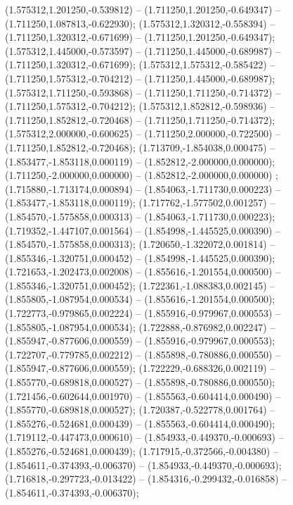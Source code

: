  (1.575312,1.201250,-0.539812) -- (1.711250,1.201250,-0.649347) -- (1.711250,1.087813,-0.622930);
 (1.575312,1.320312,-0.558394) -- (1.711250,1.320312,-0.671699) -- (1.711250,1.201250,-0.649347);
 (1.575312,1.445000,-0.573597) -- (1.711250,1.445000,-0.689987) -- (1.711250,1.320312,-0.671699);
 (1.575312,1.575312,-0.585422) -- (1.711250,1.575312,-0.704212) -- (1.711250,1.445000,-0.689987);
 (1.575312,1.711250,-0.593868) -- (1.711250,1.711250,-0.714372) -- (1.711250,1.575312,-0.704212);
 (1.575312,1.852812,-0.598936) -- (1.711250,1.852812,-0.720468) -- (1.711250,1.711250,-0.714372);
 (1.575312,2.000000,-0.600625) -- (1.711250,2.000000,-0.722500) -- (1.711250,1.852812,-0.720468);
 (1.713709,-1.854038,0.000475) -- (1.853477,-1.853118,0.000119) -- (1.852812,-2.000000,0.000000);
 (1.711250,-2.000000,0.000000) -- (1.852812,-2.000000,0.000000) ;
 (1.715880,-1.713174,0.000894) -- (1.854063,-1.711730,0.000223) -- (1.853477,-1.853118,0.000119);
 (1.717762,-1.577502,0.001257) -- (1.854570,-1.575858,0.000313) -- (1.854063,-1.711730,0.000223);
 (1.719352,-1.447107,0.001564) -- (1.854998,-1.445525,0.000390) -- (1.854570,-1.575858,0.000313);
 (1.720650,-1.322072,0.001814) -- (1.855346,-1.320751,0.000452) -- (1.854998,-1.445525,0.000390);
 (1.721653,-1.202473,0.002008) -- (1.855616,-1.201554,0.000500) -- (1.855346,-1.320751,0.000452);
 (1.722361,-1.088383,0.002145) -- (1.855805,-1.087954,0.000534) -- (1.855616,-1.201554,0.000500);
 (1.722773,-0.979865,0.002224) -- (1.855916,-0.979967,0.000553) -- (1.855805,-1.087954,0.000534);
 (1.722888,-0.876982,0.002247) -- (1.855947,-0.877606,0.000559) -- (1.855916,-0.979967,0.000553);
 (1.722707,-0.779785,0.002212) -- (1.855898,-0.780886,0.000550) -- (1.855947,-0.877606,0.000559);
 (1.722229,-0.688326,0.002119) -- (1.855770,-0.689818,0.000527) -- (1.855898,-0.780886,0.000550);
 (1.721456,-0.602644,0.001970) -- (1.855563,-0.604414,0.000490) -- (1.855770,-0.689818,0.000527);
 (1.720387,-0.522778,0.001764) -- (1.855276,-0.524681,0.000439) -- (1.855563,-0.604414,0.000490);
 (1.719112,-0.447473,0.000610) -- (1.854933,-0.449370,-0.000693) -- (1.855276,-0.524681,0.000439);
 (1.717915,-0.372566,-0.004380) -- (1.854611,-0.374393,-0.006370) -- (1.854933,-0.449370,-0.000693);
 (1.716818,-0.297723,-0.013422) -- (1.854316,-0.299432,-0.016858) -- (1.854611,-0.374393,-0.006370);
